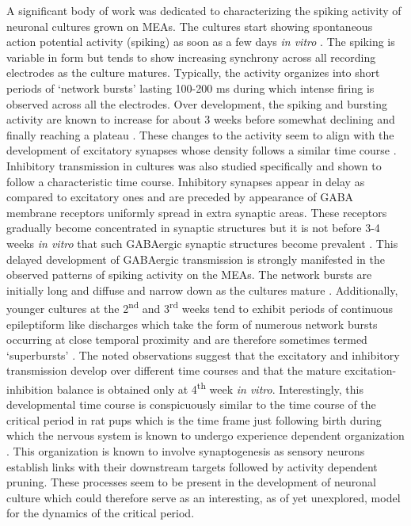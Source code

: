     A significant body of work was dedicated to characterizing the spiking activity of neuronal cultures grown on MEAs. The cultures start showing spontaneous action potential activity (spiking) as soon as a few days \textit{in vitro} \cite{wagenaar2006extremely,kamioka1996spontaneous}. The spiking is variable in form but tends to show increasing synchrony across all recording electrodes as the culture matures. Typically, the activity organizes into short periods of `network bursts' lasting 100-200 ms during which intense firing is observed across all the electrodes. Over development, the spiking and bursting activity are known to increase for about 3 weeks before somewhat declining and finally reaching a plateau \cite{chiappalone2006dissociated,bikbaev2015brain,kamioka1996spontaneous}. These changes to the activity seem to align with the development of excitatory synapses whose density follows a similar time course \cite{li2003some,ramakers1994activity}. Inhibitory transmission in cultures was also studied specifically and shown to follow a characteristic time course. Inhibitory synapses appear in delay as compared to excitatory ones and are preceded by appearance of GABA membrane receptors uniformly spread in extra synaptic areas. These receptors gradually become concentrated in synaptic structures but it is not before 3-4 weeks \textit{in vitro} that such GABAergic synaptic structures become prevalent \cite{swanwick2006development}. This delayed development of GABAergic transmission is strongly manifested in the observed patterns of spiking activity on the MEAs. The network bursts are initially long and diffuse and narrow down as the cultures mature \cite{van2004long,wagenaar2006extremely,bikbaev2015brain}. Additionally, younger cultures at the 2\textsuperscript{nd} and 3\textsuperscript{rd} weeks tend to exhibit periods of continuous epileptiform like discharges which take the form of numerous network bursts occurring at close temporal proximity and are therefore sometimes termed `superbursts' \cite{wagenaar2006extremely}. The noted observations suggest that the excitatory and inhibitory transmission develop over different time courses and that the mature excitation-inhibition balance is obtained only at 4\textsuperscript{th} week \textit{in vitro}. Interestingly, this developmental time course is conspicuously similar to the time course of the critical period in rat pups which is the time frame just following birth during which the nervous system is known to undergo experience dependent organization \cite{hensch2004critical}. This organization is known to involve synaptogenesis as sensory neurons establish links with their downstream targets followed by activity dependent pruning. These processes seem to be present in the development of neuronal culture which could therefore serve as an interesting, as of yet unexplored, model for the dynamics of the critical period.

